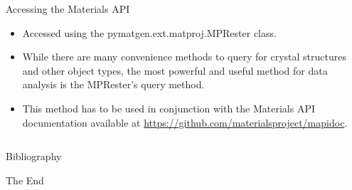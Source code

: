 \documentclass[aspectratio=169]{beamer}
\begin{document}
    \begin{frame}[fragile]{Accessing the Materials API}
        \begin{itemize}
            \item Accessed using the pymatgen.ext.matproj.MPRester class.
            \item While there are many convenience methods to query for crystal structures and other object types, the most powerful and useful method for data analysis is the MPRester's query method.
            \item This method has to be used in conjunction with the Materials API documentation available at \url{https://github.com/materialsproject/mapidoc}.
            \inputminted{python}{example_materials_api.py}
        \end{itemize}
    \end{frame}


    \begin{frame}[allowframebreaks]{Bibliography}
        
        
    \end{frame}


    \begin{frame}
        \Huge{\centerline{The End}}
    \end{frame}
\end{document}
